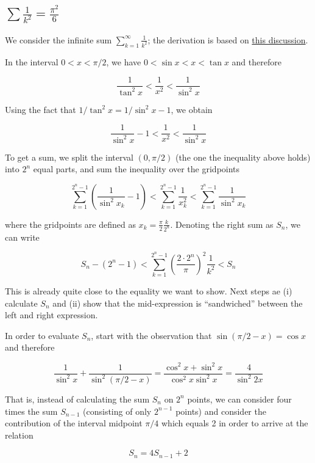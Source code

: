 
\subsection{$\sum \frac{1}{k^2} = \frac{\pi^2}{6}$}


We consider the infinite sum $\sum_{k=1}^\infty \frac{1}{k^2}$;
the derivation is based on \href{http://math.stackexchange.com/questions/8337/different-methods-to-compute-sum-limits-k-1-infty-frac1k2}{this discussion}.

In the interval $0 < x < \pi/2$, we have $0 < \sin x < x < \tan x$ and therefore

\[\frac{1}{\tan^2 x} < \frac{1}{x^2} < \frac{1}{\sin^2 x} \]

Using the fact that $1/\tan^2 x = 1/\sin^2 x -1$, we obtain

\[\frac{1}{\sin^2 x} - 1 < \frac{1}{x^2} < \frac{1}{\sin^2 x} \]

To get a sum, we split the interval $(0, \pi/2)$ (the one the inequality above holds) into $2^n$ equal parts, and sum the
inequality over the gridpoints

\[ \sum_{k=1}^{2^n-1} \left( \frac{1}{\sin^2 x_k} - 1 \right) < \sum_{k=1}^{2^n-1} \frac{1}{x_k^2} < \sum_{k=1}^{2^n-1} \frac{1}{\sin^2 x_k} \]

where the gridpoints are defined as $x_k = \frac{\pi}{2} \frac{k}{2^n}$. Denoting the right sum as $S_n$, we can write

\[ S_n - (2^n-1)  < \sum_{k=1}^{2^n-1} \left( \frac{2 \cdot 2^n}{\pi}\right)^2 \frac{1}{k^2} < S_n \]

This is already quite close to the equality we want to show. Next steps ae (i) calculate $S_n$ and (ii) show that the mid-expression is ``sandwiched'' between the left and right expression.

In order to evaluate $S_n$, start with the observation that $\sin (\pi/2 - x) = \cos x$ and therefore

\[ \frac{1}{\sin^2 x} + \frac{1}{\sin^2 (\pi/2 - x)} = \frac{\cos^2 x + \sin^2 x}{\cos^2 x \sin^2 x} = \frac{4}{\sin^2 2x}\]

That is, instead of calculating the sum $S_n$ on $2^n$ points, we can consider four times the sum $S_{n-1}$ (consisting
of only $2^{n-1}$ points) and consider the contribution of the interval midpoint $\pi/4$ which equals 2 in order to arrive at the relation

\[S_n = 4 S_{n-1} + 2\]

